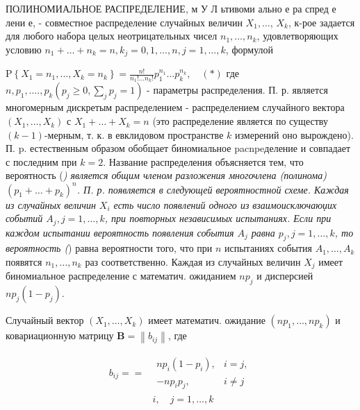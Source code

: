 \documentclass[10pt]{article}
\begin{document}
ПОЛИНОМИАЛЬНОЕ РАСПРЕДЕЛЕНИЕ, м У Л ьтивоми ально е ра спред е лени е, - совместное распределение случайных величин $X_{1}, \ldots$, $X_{k}$, к-рое задается для любого набора целых неотрицательных чисел $n_{1}, \ldots, n_{k}$, удовлетворяющих условию $n_{1}+\ldots+n_{k}=n, k_{j}=0,1, \ldots, n, j=1, \ldots, k$, формулой



$\mathrm{P}\left\{X_{1}=n_{1}, \ldots, X_{k}=n_{k}\right\}=\frac{n !}{n_{1} ! \ldots n_{k} !} p_{1}^{n_{1}} \ldots p_{k}^{n_{k}}, \quad(*)$ где $n, p_{1}, \ldots ., p_{k}\left(p_{j} \geqslant 0, \sum_{j} p_{j}=1\right)$ - параметры распределения. П. р. является многомерным дискретым распределением - распределением случайного вектора $\left(X_{1}, \ldots, X_{k}\right)$ с $X_{1}+\ldots+X_{k}=n$ (это распределение является по существу $(k-1)$-мерным, т. к. в евклидовом пространстве $k$ измерений оно вырождено). П. p. естественным образом обобщает биномиальное pacnpeделение и совпадает с последним при $k=2$. Название распределения объясняется тем, что вероятность (\textit{) является общим членом разложения многочлена (полинома) $\left(p_{1}+\ldots+p_{k}\right)^{n}$. П. р. появляется в следующей вероятностной схеме. Каждая из случайных величин $X_{i}$ есть число появлений одного из взаимоисключаюџих событий $A_{j}, j=1, \ldots, k$, при повторных независимых испытаниях. Если при каждом испытании вероятность появления события $A_{j}$ равна $p_{j}, j=1, \ldots, k$, то вероятность (}) равна вероятности того, что при $n$ испытаниях события $A_{1}, \ldots, A_{k}$ появятся $n_{1}, \ldots, n_{k}$ раз соответственно. Каждая из случайных величин $X_{j}$ имеет биномиальное распределение с математич. ожиданием $n p_{j}$ и дисперсией $n p_{j}\left(1-p_{j}\right)$.



Случайный вектор $\left(X_{1}, \ldots, X_{k}\right)$ имеет математич. ожидание $\left(n p_{1}, \ldots, n p_{k}\right)$ и ковариационную матрицу $\boldsymbol{B}=\left\|b_{i j}\right\|$, где



\[

\begin{aligned}

b_{i j}== & \begin{array}{ll}

n p_{i}\left(1-p_{i}\right), & i=j, \\

-n p_{i} p_{j}, & i \neq j

\end{array} \\

& i, \quad j=1, \ldots, k

\end{aligned}

\]
\end{document}
